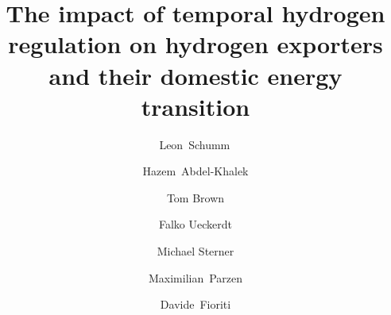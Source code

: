 \documentclass[5p,numafflabel]{elsarticle}
\begin{document}
\begin{frontmatter}

	\title{The impact of temporal hydrogen regulation on hydrogen exporters and their domestic energy transition}

    
	\author[oth,tub,lead]{Leon~Schumm\,}
	\author[ieg,alu]{Hazem~Abdel-Khalek}
	\author[tub]{Tom Brown}
	\author[pik]{Falko Ueckerdt}
	\author[oth]{Michael Sterner}
	\author[uoe]{Maximilian~Parzen}
	\author[unipi]{Davide~Fioriti}


	\address[oth]{Research Center on Energy Transmission and Storage (FENES), Faculty of Electrical and Information Technology, University of Applied Sciences (OTH) Regensburg, Seybothstr. 2, 93053 Regensburg, Germany}
	\address[tub]{Department of Digital Transformation in Energy Systems, Institute of Energy Technology, Technische Universität Berlin, Fakultät III, Einsteinufer 25 (TA 8), 10587 Berlin, Germany}
	\address[ieg]{Fraunhofer Research Institution for Energy Infrastructures and Geothermal Systems IEG, Gulbener Straße 23, 03046 Cottbus, Germany}
	\address[alu]{Albert-Ludwigs Universität Freiburg, Faculty of Environment and Natural Resources, Tennenbacher Str. 4, 79106 Freiburg im Breisgau, Germany}
	\address[pik]{Potsdam Institute for Climate Impact Research, Telegrafenberg, 14473 Potsdam, Germany}
	\address[uoe]{University of Edinburgh, Institute for Energy Systems, EH9 3DW Edinburgh, United Kingdom}
	\address[unipi]{University of Pisa, Department of Energy Systems, Territory and Construction Engineering, Largo Lucio Lazzarino, 56122 Pisa, Italy}
	\address[lead]{Lead contact}

	\begin{abstract}


\end{abstract}
\end{frontmatter}
\end{document}
